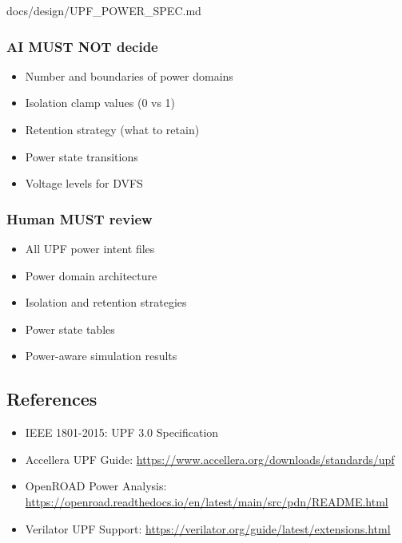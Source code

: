\begin{relocated}{docs/design/UPF_POWER_SPEC.md}
\subsubsection{AI MUST NOT decide}\label{ds:ch:upf-power-spec:ai-must-not-decide}

\begin{itemize}
\tightlist
\item
  Number and boundaries of power domains
\item
  Isolation clamp values (0 vs 1)
\item
  Retention strategy (what to retain)
\item
  Power state transitions
\item
  Voltage levels for DVFS
\end{itemize}

\subsubsection{Human MUST review}\label{ds:ch:upf-power-spec:human-must-review}

\begin{itemize}
\tightlist
\item
  All UPF power intent files
\item
  Power domain architecture
\item
  Isolation and retention strategies
\item
  Power state tables
\item
  Power-aware simulation results
\end{itemize}

\subsection{References}\label{ds:ch:upf-power-spec:references}

\begin{itemize}
\tightlist
\item
  IEEE 1801-2015: UPF 3.0 Specification
\item
  Accellera UPF Guide:
  \href{https://www.accellera.org/downloads/standards/upf}{https:/\allowbreak{}/\allowbreak{}www.accellera.org/\allowbreak{}downloads/\allowbreak{}standards/\allowbreak{}upf}
\item
  OpenROAD Power Analysis:
  \href{https://openroad.readthedocs.io/en/latest/main/src/pdn/README.html}{https:/\allowbreak{}/\allowbreak{}openroad.readthedocs.io/\allowbreak{}en/\allowbreak{}latest/\allowbreak{}main/\allowbreak{}src/\allowbreak{}pdn/\allowbreak{}README.html}
\item
  Verilator UPF Support:
  \href{https://verilator.org/guide/latest/extensions.html}{https:/\allowbreak{}/\allowbreak{}verilator.org/\allowbreak{}guide/\allowbreak{}latest/\allowbreak{}extensions.html}
\end{itemize}
\end{relocated}

